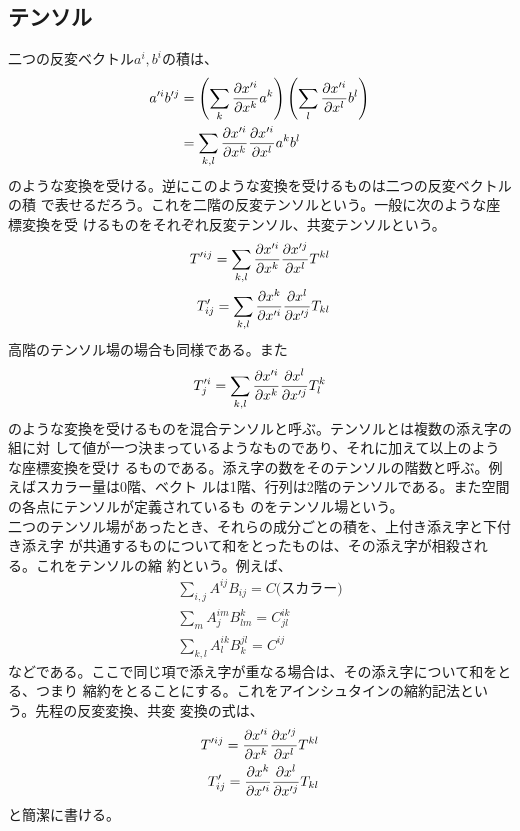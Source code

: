         \subsection{テンソル}
            二つの反変ベクトル$a^i,b^i$の積は、
            \begin{align*}
                a'^ib'^j &= \lr{\sum_k \pd[x'^i]{x^k}a^k}
                \lr{\sum_l \pd[x'^i]{x^l}b^l}\\
                &= \sum_{k,l} \pd[x'^i]{x^k}\pd[x'^i]{x^l}a^kb^l
            \end{align*}
            のような変換を受ける。逆にこのような変換を受けるものは二つの反変ベクトルの積
            で表せるだろう。これを二階の反変テンソルという。一般に次のような座標変換を受
            けるものをそれぞれ反変テンソル、共変テンソルという。
            \begin{eqnarray*}
                T'^{ij} = \sum_{k,l}\pd[x'^i]{x^k}\pd[x'^j]{x^l}T^{kl}\\
                T'_{ij} = \sum_{k,l}\pd[x^k]{x'^i}\pd[x^l]{x'^j}T_{kl}
            \end{eqnarray*}
            高階のテンソル場の場合も同様である。また
                \[T'^i_j = \sum_{k,l}\pd[x'^i]{x^k}\pd[x^l]{x'^j}T^k_l\]
            のような変換を受けるものを混合テンソルと呼ぶ。テンソルとは複数の添え字の組に対
            して値が一つ決まっているようなものであり、それに加えて以上のような座標変換を受け
            るものである。添え字の数をそのテンソルの階数と呼ぶ。例えばスカラー量は0階、ベクト
            ルは1階、行列は2階のテンソルである。また空間の各点にテンソルが定義されているも
            のをテンソル場という。\\
        
            二つのテンソル場があったとき、それらの成分ごとの積を、上付き添え字と下付き添え字
            が共通するものについて和をとったものは、その添え字が相殺される。これをテンソルの縮
            約という。例えば、
            \begin{gather*}
                \sum_{i,j} A^{ij}B_{ij} = C\text{(スカラー)}\\
                \sum_m A^{im}_jB^k_{lm} = C^{ik}_{jl}\\
                \sum_{k,l} A^{ik}_lB^{jl}_k = C^{ij}
            \end{gather*}
            などである。ここで同じ項で添え字が重なる場合は、その添え字について和をとる、つまり
            縮約をとることにする。これをアインシュタインの縮約記法という。先程の反変変換、共変
            変換の式は、
            \begin{eqnarray*}
                T'^{ij} = \pd[x'^i]{x^k}\pd[x'^j]{x^l}T^{kl}\\
                T'_{ij} = \pd[x^k]{x'^i}\pd[x^l]{x'^j}T_{kl}
            \end{eqnarray*}
            と簡潔に書ける。